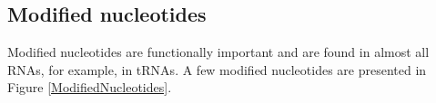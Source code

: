 \documentclass[12pt]{article}
\begin{document}
\subsection{Modified nucleotides}
Modified nucleotides are functionally important and are found in almost all RNAs, for example, in tRNAs. A few modified nucleotides are presented in Figure \ref{ModifiedNucleotides}. 
\begin{figure}[h!]
\centering
\begin{center}

\end{center}
\end{figure}
\end{document}
